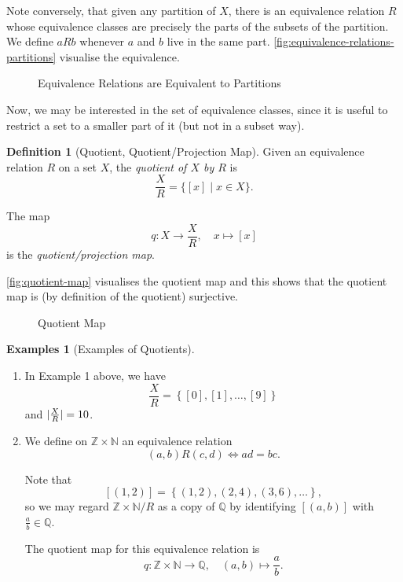 \documentclass{article}
\theoremstyle{definition}
\newtheorem{definition}[theorem]{Definition}
\newtheorem{examples}[theorem]{Examples}
\theoremstyle{remark}
\DeclarePairedDelimiter{\abs}{\lvert}{\rvert}
\newcommand{\pqty}[1]{\left(#1\right)}
\newcommand{\bqty}[1]{\left[#1\right]}
\newcommand{\Bqty}[1]{\left\{#1\right\}}
\newcommand{\set}[2]{\{#1\mid #2\}}
\newcommand{\flatfrac}[2]{\frac{#1}{#2}}
\newcommand{\function}[5]{#1:#2\to #3,\quad #4\mapsto #5}
\newcommand{\NN}{\mathbb{N}}
\newcommand{\ZZ}{\mathbb{Z}}
\newcommand{\QQ}{\mathbb{Q}}
\begin{document}
Note conversely, that given any partition of \(X\), there is an equivalence relation \(R\) whose equivalence classes are precisely the parts of the subsets of the partition. We define \(aRb\) whenever \(a\) and \(b\) live in the same part. \autoref{fig:equivalence-relations-partitions} visualise the equivalence.

\begin{figure}[ht!]
    \centering
    \caption{Equivalence Relations are Equivalent to Partitions}
    \label{fig:equivalence-relations-partitions}
\end{figure}

Now, we may be interested in the set of equivalence classes, since it is useful to restrict a set to a smaller part of it (but not in a subset way).

\begin{definition}[Quotient, Quotient/Projection Map]
    Given an equivalence relation \(R\) on a set \(X\), the \emph{quotient of \(X\) by \(R\)} is
    \[
        \flatfrac{X}{R} = \set{\bqty{x}}{x \in X}.
    \]

    The map
    \[
        \function{q}{X}{\flatfrac{X}{R}}{x}{\bqty{x}}
    \]
    is the \emph{quotient/projection map}.
\end{definition}

\autoref{fig:quotient-map} visualises the quotient map and this shows that the quotient map is (by definition of the quotient) surjective.

\begin{figure}[ht!]
    \centering
    \caption{Quotient Map}
    \label{fig:quotient-map}
\end{figure}

\begin{examples}[Examples of Quotients]
    \begin{enumerate}
        \item In Example 1 above, we have
        \[
            \flatfrac{X}{R} = \Bqty{\bqty{0}, \bqty{1}, \ldots, \bqty{9}}
        \]
        and \(\abs{\flatfrac{X}{R}} = 10\).

        \item We define on \(\ZZ \times \NN\) an equivalence relation
        \[
            \pqty{a, b} R \pqty{c, d} \iff ad = bc.
        \]

        Note that
        \[
            \bqty{\pqty{1, 2}} = \Bqty{\pqty{1, 2}, \pqty{2, 4}, \pqty{3, 6}, \ldots},
        \]
        so we may regard \(\ZZ \times \NN / R\) as a copy of \(\QQ\) by identifying \(\bqty{\pqty{a, b}}\) with \(\frac{a}{b} \in \QQ\).

        The quotient map for this equivalence relation is
        \[
            \function{q}{\ZZ \times \NN}{\QQ}{\pqty{a, b}}{\frac{a}{b}.}
        \]
    \end{enumerate}
\end{examples}
\end{document}

